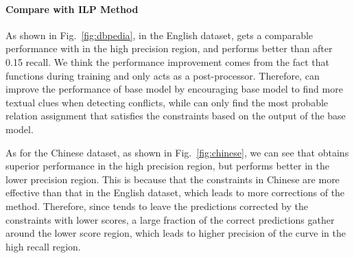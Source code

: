 \paragraph{Compare with ILP Method}
As shown in Fig.~\ref{fig:dbpedia}, in the English dataset,
\SL gets a comparable performance with \ILP in the high precision region, and performs better than \ILP after 0.15 recall.
We think the performance improvement comes from the fact that \SL functions during training and \ILP only acts as a post-processor.
Therefore, \SL can improve the performance of base model by encouraging base model to find more textual clues when detecting conflicts, while \ILP can only find the most probable relation assignment that satisfies the constraints based on the output of the base model.


As for the Chinese dataset, as shown in Fig.~\ref{fig:chinese}, we can see that \SL obtains superior performance in the high precision region, but \ILP performs better in the lower precision region.
This is because that the constraints in Chinese are more effective than that in the English dataset, which leads to more corrections of the \ILP method.
Therefore, since \ILP tends to leave the predictions corrected by the constraints with lower scores, a large fraction of the correct predictions gather around the lower score region, which leads to higher precision of the \ILP curve in the high recall region.


